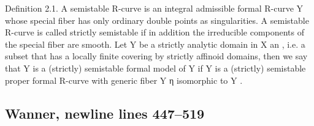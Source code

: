 \documentclass[
  10pt,
]{article}
\newenvironment{Shaded}{}{}
\newcommand{\NormalTok}[1]{#1}
\begin{document}
\begin{Shaded}
\begin{Highlighting}[]
\NormalTok{Definition 2.1. A semistable R{-}curve is an integral admissible formal R{-}curve Y whose}
\NormalTok{special fiber has only ordinary double points as singularities. A semistable R{-}curve is}
\NormalTok{called strictly semistable if in addition the irreducible components of the special fiber}
\NormalTok{are smooth. Let Y be a strictly analytic domain in X an , i.e. a subset that has a locally}
\NormalTok{finite covering by strictly affinoid domains, then we say that Y is a (strictly) semistable}
\NormalTok{formal model of Y if Y is a (strictly) semistable proper formal R{-}curve with generic fiber}
\NormalTok{Y η isomorphic to Y .}
\end{Highlighting}
\end{Shaded}

\subsection{Wanner, newline lines
447--519}\label{wanner-newline-lines-447519}
\end{document}
